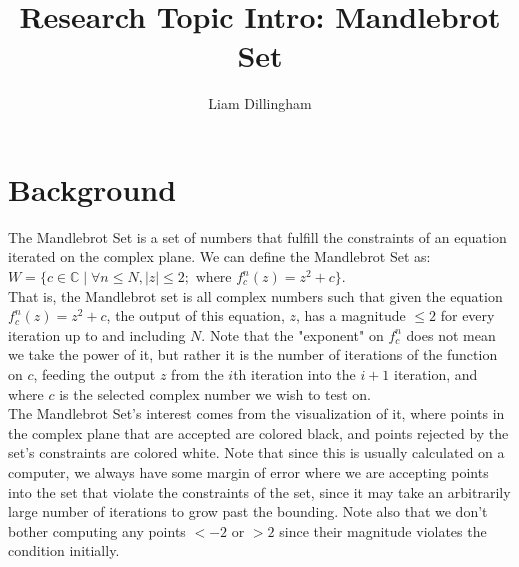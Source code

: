 \documentclass[20pt]{article} %
\title{Research Topic Intro: Mandlebrot Set}
\author{Liam Dillingham}
\begin{document}
\maketitle

\section{Background}

The Mandlebrot Set is a set of numbers that fulfill the constraints of an equation iterated on the complex plane.  We can define the Mandlebrot Set as: \\ 

$W = \{ c \in \mathbb{C} \mid \forall n \leq N, |z| \leq 2; \text{ where }  f_c^{n}(z) = z^{2}+c\}$. \\ 

That is, the Mandlebrot set is all complex numbers such that given the equation \\$f_c^{n}(z) = z^{2}+c$, the output of this equation, $z$, has a magnitude $\leq 2$ for every iteration up to and including $N$.  Note that the "exponent" on $f_c^{n}$ does not mean we take the power of it, but rather it is the number of iterations of the function on $c$, feeding the output $z$ from the $i$th iteration into the $i+1$ iteration, and where $c$ is the selected complex number we wish to test on. \\ 

The Mandlebrot Set's interest comes from the visualization of it, where points in the complex plane that are accepted are colored black, and points rejected by the set's constraints are colored white.  Note that since this is usually calculated on a computer, we always have some margin of error where we are accepting points into the set that violate the constraints of the set, since it may take an arbitrarily large number of iterations to grow past the bounding.  Note also that we don't bother computing any points $<-2$ or $>2$ since their magnitude violates the condition initially.  
\end{document}
